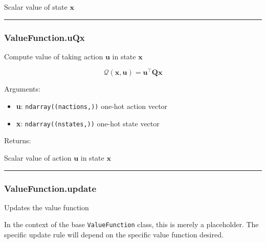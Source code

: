Scalar value of state \(\mathbf x\)

\begin{center}\rule{0.5\linewidth}{\linethickness}\end{center}

\subsubsection{ValueFunction.uQx}\label{valuefunction.uqx}

\begin{Shaded}
\begin{Highlighting}[]
\end{Highlighting}
\end{Shaded}

Compute value of taking action \(\mathbf u\) in state \(\mathbf x\)

\[
\mathcal Q(\mathbf x, \mathbf u) = \mathbf u^\top \mathbf Q \mathbf x
\]

Arguments:

\begin{itemize}
\tightlist
\item
  \textbf{u}: \texttt{ndarray((nactions,))} one-hot action vector
\item
  \textbf{x}: \texttt{ndarray((nstates,))} one-hot state vector
\end{itemize}

Returns:

Scalar value of action \(\mathbf u\) in state \(\mathbf x\)

\begin{center}\rule{0.5\linewidth}{\linethickness}\end{center}

\subsubsection{ValueFunction.update}\label{valuefunction.update}

\begin{Shaded}
\begin{Highlighting}[]
\end{Highlighting}
\end{Shaded}

Updates the value function

In the context of the base \texttt{ValueFunction} class, this is merely
a placeholder. The specific update rule will depend on the specific
value function desired.

